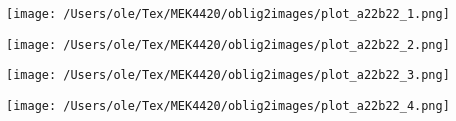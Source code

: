 \noindent
\begin{minipage}[t]{0.45\linewidth}
    \texttt{[image: /Users/ole/Tex/MEK4420/oblig2images/plot\_a22b22\_1.png]}
    \label{fig:a22_1}
\end{minipage}
\hspace{0.05\linewidth}
\begin{minipage}[t]{0.45\linewidth}
    \texttt{[image: /Users/ole/Tex/MEK4420/oblig2images/plot\_a22b22\_2.png]}
    \label{fig:a22_2}
\end{minipage}

\vspace{0.5cm} %

\noindent
\begin{minipage}[t]{0.45\linewidth}
    \texttt{[image: /Users/ole/Tex/MEK4420/oblig2images/plot\_a22b22\_3.png]}
    \label{fig:a22_3}
\end{minipage}
\hspace{0.05\linewidth}
\begin{minipage}[t]{0.45\linewidth}
    \texttt{[image: /Users/ole/Tex/MEK4420/oblig2images/plot\_a22b22\_4.png]}
    \label{fig:a22_4}
\end{minipage} 